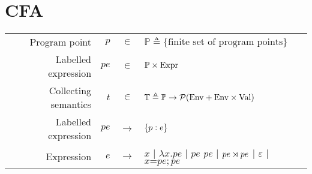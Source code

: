 \documentclass{article}
\begin{document}
\section{CFA}
\begin{center}
  \begin{tabular}{rrcl}
    Program point        & $p$  & $\in$         & $\mathbb{P}\triangleq\{\text{finite set of program points}\}$                           \\
    Labelled expression  & $pe$ & $\in$         & $\mathbb{P}\times\text{Expr}$                                                                 \\
    Collecting semantics & $t$  & $\in$         & $\mathbb{T}\triangleq\mathbb{P}\rightarrow\mathcal{P}(\text{Env}+\text{Env}\times\text{Val})$                 \\
    Labelled expression  & $pe$ & $\rightarrow$ & $\{{p}:{e}\}$                                                                         \\
    Expression           & $e$  & $\rightarrow$ & $x$ | $\lambda x.pe$ | $pe$ $pe$ | ${pe}\rtimes{pe}$ | $\varepsilon$ | $x\texttt{=}pe;pe$
  \end{tabular}
\end{center}
\end{document}
